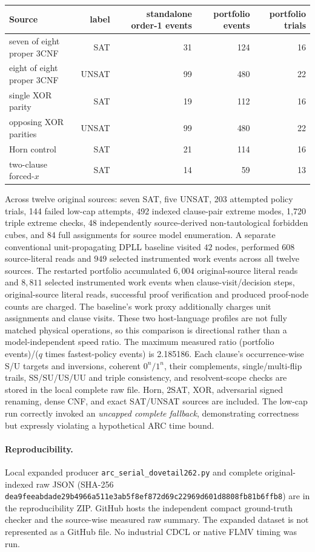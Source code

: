 \documentclass[11pt]{article}
\begin{document}
\begin{center}\begin{tabular}{lrrrr}\toprule
Source&label&standalone order-1 events&portfolio events&portfolio trials\\\midrule
seven of eight proper 3CNF&SAT&31&124&16\\
eight of eight proper 3CNF&UNSAT&99&480&22\\
single XOR parity&SAT&19&112&16\\
opposing XOR parities&UNSAT&99&480&22\\
Horn control&SAT&21&114&16\\
two-clause forced-$x$&SAT&14&59&13\\\bottomrule
\end{tabular}\end{center}
Across twelve original sources: seven SAT, five UNSAT, 203 attempted policy trials, 144 failed low-cap attempts, 492 indexed clause-pair extreme modes, 1,720 triple extreme checks, 48 independently source-derived non-tautological forbidden cubes, and 84 full assignments for source model enumeration. A separate conventional unit-propagating DPLL baseline visited $42$ nodes, performed $608$ source-literal reads and $949$ selected instrumented work events across all twelve sources. The restarted portfolio accumulated $6{,}004$ original-source literal reads and $8{,}811$ selected instrumented work events when clause-visit/decision steps, original-source literal reads, successful proof verification and produced proof-node counts are charged. The baseline's work proxy additionally charges unit assignments and clause visits. These two host-language profiles are not fully matched physical operations, so this comparison is directional rather than a model-independent speed ratio. The maximum measured ratio (portfolio events)/($q$ times fastest-policy events) is 2.185186. Each clause's occurrence-wise S/U targets and inversions, coherent $0^n/1^n$, their complements, single/multi-flip trails, SS/SU/US/UU and triple consistency, and resolvent-scope checks are stored in the local complete raw file. Horn, 2SAT, XOR, adversarial signed renaming, dense CNF, and exact SAT/UNSAT sources are included. The low-cap run correctly invoked an \emph{uncapped complete fallback}, demonstrating correctness but expressly violating a hypothetical ARC time bound.

\paragraph{Reproducibility.} Local expanded producer \texttt{arc\_serial\_dovetail262.py} and complete original-indexed raw JSON (SHA-256 \texttt{dea9feeabdade29b4966a511e3ab5f8ef872d69c22969d601d8808fb81b6ffb8}) are in the reproducibility ZIP. GitHub hosts the independent compact ground-truth checker and the source-wise measured raw summary. The expanded dataset is not represented as a GitHub file. No industrial CDCL or native FLMV timing was run.
\end{document}
